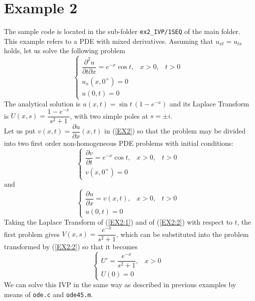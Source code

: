 \documentclass[a4paper,10pt]{report}%
\begin{document}
\section{Example 2}\label{SECT:EX2}
The sample code is located in the sub-folder {\tt ex2\_IVP/1SEQ} of the main folder.
\\
This example refers to a PDE with mixed derivatives. Assuming that $u_{xt}=u_{tx}$ holds, let us solve the following problem
\begin{equation}\label{EX2}
\left\{\begin{array}{lll}
\dfrac{\partial^2 u}{\partial t \partial x}=e^{-x}\cos t, &  x > 0, & t > 0 \\[8pt]
u_x(x,0^+) = 0 \\[4pt]
u(0,t) = 0
\end{array}\right.
\end{equation}
The analytical solution is $u(x,t) = \sin t\,\left( 1-e^{-x} \right)$ and its Laplace Transform is $U(x,s) = \dfrac{1-e^{-x}}{s^2+1}$, with two simple poles at $s=\pm i$.
\\
Let us put $v(x,t) = \dfrac{\partial u}{\partial x}(x,t)$ in (\ref{EX2}) so that the problem may be divided into two first order non-homogeneous PDE problems with initial conditions:
\begin{equation}\label{EX2:1}
\left\{\begin{array}{lll}
\dfrac{\partial v}{\partial t} = e^{-x}\cos t, &  x > 0, & t > 0 \\[8pt]
v(x,0^+) = 0
\end{array}\right.
\end{equation}
and
\begin{equation}\label{EX2:2}
\left\{\begin{array}{lll}
\dfrac{\partial u}{\partial x} = v(x,t), &  x > 0, & t > 0 \\[8pt]
u(0,t) = 0
\end{array}\right.
\end{equation}
Taking the Laplace Transform of (\ref{EX2:1}) and of (\ref{EX2:2}) with respect to $t$, the first problem gives
$V(x,s) = \dfrac{e^{-x}}{s^2+1}$, which can be substituted into the problem transformed by (\ref{EX2:2}) so that it
becomes
\begin{equation}\label{EX2:3}
\left\{\begin{array}{ll}
U' = \dfrac{e^{-x}}{s^2+1}, &  x > 0 \\[8pt]
U(0) = 0
\end{array}\right.
\end{equation}
We can solve this IVP in the same way as described in previous examples by means of {\tt ode.c} and {\tt ode45.m}.
\end{document}
